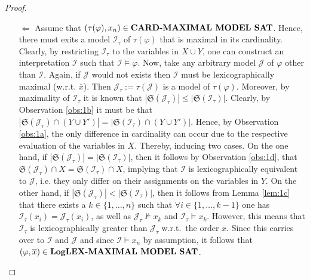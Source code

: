 \documentclass [11pt]{article}
\newcommand{\MAXCARDSAT}{\mbox{\bf CARD-MAXIMAL MODEL SAT}}
\newcommand{\LogMAXLEXSAT}{\mbox{\bf LogLEX-MAXIMAL MODEL SAT}}
\newcommand{\nmodels}{\not\models}
\begin{document}
\begin{proof}
\begin{itemize}
%
%

\item[$\Leftarrow$] Assume that $(\tau(\varphi), x_n)  \in \MAXCARDSAT $.  Hence, there must exits a model $\mathcal{I}_{\tau}$ of $\tau(\varphi)$ that is maximal in its cardinality. Clearly, by restricting $\mathcal{I}_{\tau}$ to the variables in $X\cup Y$, one can construct an interpretation $\mathcal{I}$ such that $\mathcal{I} \models \varphi$. Now, take any arbitrary model $\mathcal{J}$ of $\varphi$ other than $\mathcal{I}$. Again, if $\mathcal{J}$ would not exists then $\mathcal{I}$ must be lexicographically maximal (w.r.t. $\overline{x}$). Then $\mathcal{J}_{\tau}:=\tau(\mathcal{J})$ is a model of $\tau(\varphi)$. Moreover, by maximality of $\mathcal{I}_{\tau}$ it is known that $|\mathfrak{S}(\mathcal{J}_{\tau})| \leq |\mathfrak{S}(\mathcal{I}_{\tau})|$.
Clearly, by Observation \ref{obs:1b} it must be that $|\mathfrak{S}(\mathcal{J}_{\tau}) \cap (Y \cup Y')|=|\mathfrak{S}(\mathcal{I}_{\tau}) \cap (Y \cup Y')|$.
Hence, by Observation \ref{obs:1a}, the only difference in cardinality can occur due to the respective evaluation of the variables in $X$.  Thereby, inducing two cases. On the one hand, if $|\mathfrak{S}(\mathcal{J}_{\tau})|=|\mathfrak{S}(\mathcal{I}_{\tau})|$, then it follows by Observation \ref{obs:1d}, that $\mathfrak{S}(\mathcal{J}_{\tau}) \cap X=\mathfrak{S}(\mathcal{I}_{\tau}) \cap X$, implying that $\mathcal{I}$ is lexicographically equivalent to $\mathcal{J}$, i.e. they only differ on their assignments on the variables in $Y$. On the other hand, if $|\mathfrak{S}(\mathcal{J}_{\tau})|<|\mathfrak{S}(\mathcal{I}_{\tau})|$, then it follows from Lemma \ref{lem:1c} that there exists a $k \in \{1, \dots , n \}$ such that $\forall i \in  \{1, \dots , k-1 \}$ one has $\mathcal{I}_{\tau}(x_i)=\mathcal{J}_{\tau}(x_i)$, as well as $\mathcal{J}_{\tau} \nmodels x_k$ and $\mathcal{I}_{\tau}  \models x_k$. However, this means that $\mathcal{I}_{\tau}$ is lexicographically greater than $\mathcal{J}_{\tau}$ w.r.t.\ the order $\overline{x}$. Since this carries over to $\mathcal{I}$ and $\mathcal{J}$ and since $\mathcal{I} \models x_n$ by assumption, it follows that $(\varphi, \overline{x}) \in  \LogMAXLEXSAT$.



\end{itemize}
\end{proof}
\end{document}
